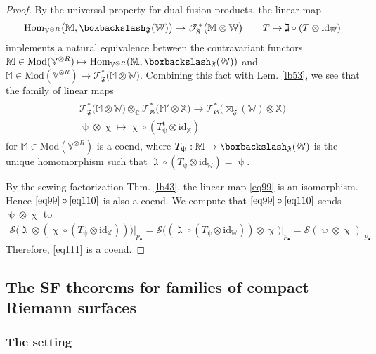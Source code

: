 \documentclass[11pt,b5paper,notitlepage]{article}
\theoremstyle{definition}
\theoremstyle{plain}
\newcommand{\tr}{\mathrm{t}} %
\newcommand{\Hom}{\mathrm{Hom}}
\newcommand{\blt}{\bullet}
\newcommand{\Vbb}{\mathbb V}
\newcommand{\Xbb}{\mathbb X}
\newcommand{\Wbb}{\mathbb W}
\newcommand{\Mbb}{\mathbb M}
\newcommand{\Cbb}{\mathbb C}
\newcommand{\<}{\left\langle}
\renewcommand{\>}{\right\rangle}
\newcommand{\ST}{\mathscr{T}}
\newcommand{\MS}{\mathcal{S}}
\newcommand{\bbs}{\boxbackslash}
\newcommand{\Mod}{\mathrm{Mod}}
\newcommand{\id}{\mathrm{id}}
\newcommand{\ff}{\mathfrak{F}}
\newcommand{\fg}{\mathfrak{G}}
\numberwithin{equation}{section}
\begin{document}
\begin{proof}
By the universal property for dual fusion products, the linear map
\begin{gather*}
\Hom_{\Vbb^{{\otimes R}}}\big(\Mbb,\bbs_\ff(\Wbb)\big)\rightarrow\ST^*_\ff\big(\Mbb\otimes\Wbb\big)\qquad T\mapsto \gimel\circ(T\otimes\id_\Wbb)
\end{gather*}
implements a natural equivalence between the contravariant functors $\Mbb\in\Mod(\Vbb^{\otimes R})\mapsto\Hom_{\Vbb^{\otimes R}}(\Mbb,\bbs_\ff(\Wbb))$ and $\Mbb\in\Mod(\Vbb^{\otimes R})\mapsto\ST^*_\ff\big(\Mbb\otimes\Wbb\big)$. Combining this fact with Lem. \ref{lb53}, we see that the family of linear maps
\begin{gather}\label{eq110}
\begin{gathered}
\ST^*_\ff\big(\Mbb\otimes\Wbb\big)\otimes_\Cbb\ST^*_\fg\big(\Mbb'\otimes\Xbb\big)\rightarrow\ST^*_\fg\big(\boxtimes_\ff(\Wbb)\otimes\Xbb\big)\\ \uppsi\otimes\upchi\mapsto \upchi\circ(T_\uppsi^\tr\otimes\id_\Xbb)
\end{gathered}
\end{gather}
for $\Mbb\in\Mod(\Vbb^{\otimes R})$ is a coend, where $T_\uppsi:\Mbb\rightarrow\bbs_\ff(\Wbb)$ is the unique homomorphism such that $\gimel\circ(T_\uppsi\otimes\id_\Wbb)=\uppsi$. 

By the sewing-factorization Thm. \ref{lb43}, the linear map \eqref{eq99} is an isomorphism. Hence $\eqref{eq99}\circ\eqref{eq110}$ is also a coend. We compute that $\eqref{eq99}\circ\eqref{eq110}$ sends $\uppsi\otimes\upchi$ to
\begin{align*}
\MS\big(\gimel\otimes(\upchi\circ (T_\uppsi^\tr\otimes\id_\Xbb))\big)\big|_{p_\blt}=\MS\big((\gimel\circ (T_\uppsi\otimes\id_\Wbb))\otimes\upchi\big)\big|_{p_\blt}=\MS(\uppsi\otimes\upchi)\big|_{p_\blt}
\end{align*}
Therefore, \eqref{eq111} is a coend.
\end{proof}






\subsection{The SF theorems for families of compact Riemann surfaces}



\subsubsection{The setting}\label{lb50}
\end{document}
